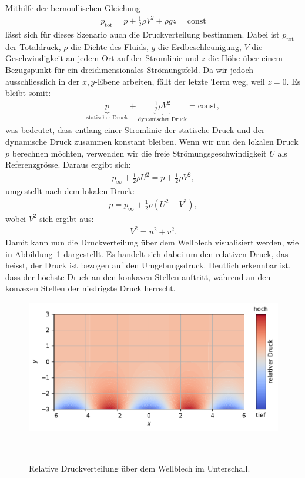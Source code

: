Mithilfe der bernoullischen Gleichung~\cite{BernoulliWikiDE}
\begin{align*}
    p_{\text{tot}} 
    = 
    p 
    + 
    \frac{1}{2} \rho V^2 
    + 
    \rho g z 
    = \text{const}
\end{align*}
lässt sich für dieses Szenario auch die Druckverteilung bestimmen.
Dabei ist $p_{\text{tot}}$ der Totaldruck, 
$\rho$ die Dichte des Fluids, $g$ die Erdbeschleunigung,
$V$ die Geschwindigkeit an jedem Ort auf der Stromlinie 
und $z$ die Höhe über einem Bezugspunkt 
für ein dreidimensionales Strömungsfeld.
Da wir jedoch ausschliesslich in der $x,y$-Ebene arbeiten, 
fällt der letzte Term weg, weil $z = 0$.
Es bleibt somit:
\begin{align*}
    \underbrace{p}_{\text{statischer Druck}} 
    + 
    \underbrace{\frac{1}{2} \rho V^2}_{\text{dynamischer Druck}} 
    = 
    \text{const},
\end{align*}
was bedeutet, dass entlang einer Stromlinie 
der statische Druck und der dynamische Druck
zusammen konstant bleiben.
Wenn wir nun den lokalen Druck $p$ berechnen möchten, 
verwenden wir die freie Strömungsgeschwindigkeit $U$
als Referenzgrösse. 
Daraus ergibt sich:
\begin{align*}
    p_\infty 
    + 
    \frac{1}{2} \rho U^2 
    = 
    p 
    + 
    \frac{1}{2} \rho V^2,
\end{align*}
umgestellt nach dem lokalen Druck:
\begin{align*}
    p = p_\infty + \frac{1}{2} \rho (U^2 - V^2),
\end{align*}
wobei $V^2$ sich ergibt aus:
\begin{align*}
    V^2 = u^2 + v^2.
\end{align*}
Damit kann nun die Druckverteilung über dem Wellblech visualisiert werden, 
wie in Abbildung~\ref{fig:druckverteilung} dargestellt. 
Es handelt sich dabei um den relativen Druck, 
das heisst, der Druck ist bezogen auf den Umgebungsdruck. 
Deutlich erkennbar ist, dass der höchste Druck an den konkaven Stellen auftritt, 
während an den konvexen Stellen der niedrigste Druck herrscht.
\begin{figure}
    \centering
    \includegraphics[width=\textwidth]{papers/ueberschall/figures/Druckverteilung.pdf}
    \caption{Relative Druckverteilung über dem Wellblech im Unterschall.}
    ~\label{fig:druckverteilung}  
\end{figure}

